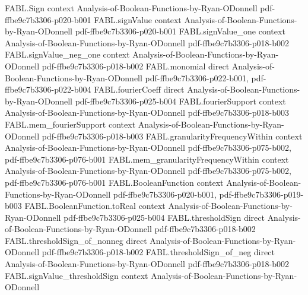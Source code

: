 \begin{theorem}
\label{FABL.majority_toReal_mul_sum_signValue_eq_abs}
\leanok
{}
\proofstep
  {FABL.Sign}
  {context}
  {Analysis-of-Boolean-Functions-by-Ryan-ODonnell}
  {pdf-ffbe9c7b3306-p020-b001}
\proofstep
  {FABL.signValue}
  {context}
  {Analysis-of-Boolean-Functions-by-Ryan-ODonnell}
  {pdf-ffbe9c7b3306-p020-b001}
\proofstep
  {FABL.signValue_one}
  {context}
  {Analysis-of-Boolean-Functions-by-Ryan-ODonnell}
  {pdf-ffbe9c7b3306-p018-b002}
\proofstep
  {FABL.signValue_neg_one}
  {context}
  {Analysis-of-Boolean-Functions-by-Ryan-ODonnell}
  {pdf-ffbe9c7b3306-p018-b002}
\proofstep
  {FABL.monomial}
  {direct}
  {Analysis-of-Boolean-Functions-by-Ryan-ODonnell}
  {pdf-ffbe9c7b3306-p022-b001,
    pdf-ffbe9c7b3306-p022-b004}
\proofstep
  {FABL.fourierCoeff}
  {direct}
  {Analysis-of-Boolean-Functions-by-Ryan-ODonnell}
  {pdf-ffbe9c7b3306-p025-b004}
\proofstep
  {FABL.fourierSupport}
  {context}
  {Analysis-of-Boolean-Functions-by-Ryan-ODonnell}
  {pdf-ffbe9c7b3306-p018-b003}
\proofstep
  {FABL.mem_fourierSupport}
  {context}
  {Analysis-of-Boolean-Functions-by-Ryan-ODonnell}
  {pdf-ffbe9c7b3306-p018-b003}
\proofstep
  {FABL.granularityFrequencyWithin}
  {context}
  {Analysis-of-Boolean-Functions-by-Ryan-ODonnell}
  {pdf-ffbe9c7b3306-p075-b002,
    pdf-ffbe9c7b3306-p076-b001}
\proofstep
  {FABL.mem_granularityFrequencyWithin}
  {context}
  {Analysis-of-Boolean-Functions-by-Ryan-ODonnell}
  {pdf-ffbe9c7b3306-p075-b002,
    pdf-ffbe9c7b3306-p076-b001}
\proofstep
  {FABL.BooleanFunction}
  {context}
  {Analysis-of-Boolean-Functions-by-Ryan-ODonnell}
  {pdf-ffbe9c7b3306-p020-b001,
    pdf-ffbe9c7b3306-p019-b003}
\proofstep
  {FABL.BooleanFunction.toReal}
  {context}
  {Analysis-of-Boolean-Functions-by-Ryan-ODonnell}
  {pdf-ffbe9c7b3306-p025-b004}
\proofstep
  {FABL.thresholdSign}
  {direct}
  {Analysis-of-Boolean-Functions-by-Ryan-ODonnell}
  {pdf-ffbe9c7b3306-p018-b002}
\proofstep
  {FABL.thresholdSign_of_nonneg}
  {direct}
  {Analysis-of-Boolean-Functions-by-Ryan-ODonnell}
  {pdf-ffbe9c7b3306-p018-b002}
\proofstep
  {FABL.thresholdSign_of_neg}
  {direct}
  {Analysis-of-Boolean-Functions-by-Ryan-ODonnell}
  {pdf-ffbe9c7b3306-p018-b002}
\proofstep
  {FABL.signValue_thresholdSign}
  {context}
  {Analysis-of-Boolean-Functions-by-Ryan-ODonnell}

\end{theorem}
